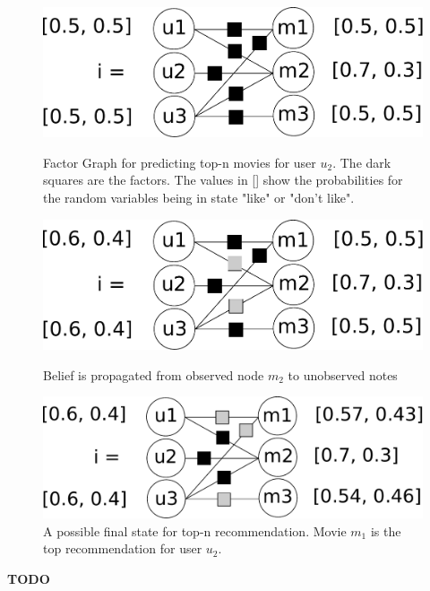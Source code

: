 \begin{figure}[h]\centering

    \includegraphics[scale=0.33]{graphics/top-n-graph.pdf}
\caption{Factor Graph for predicting top-n movies for user $u_2$. The dark squares are the factors. The values in [] show the probabilities for the random variables being in state "like" or "don't like".\label{top_n_graph}}

\includegraphics[scale=0.33]{graphics/top-n-important-messages.pdf}
  \caption{Belief is propagated from observed node $m_2$ to unobserved notes \label{top_n_graph_important_msg}}

    \includegraphics[scale=0.33]{graphics/top-n-final.pdf}
  \caption{A possible final state for top-n recommendation. Movie $m_1$ is the top recommendation for user $u_2$. \label{top_n_graph_final_state}}

\end{figure}


\textbf{TODO}

%
%
%
